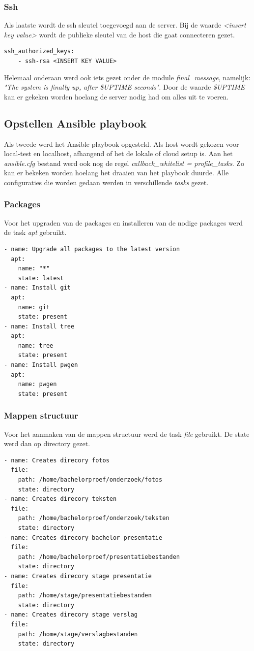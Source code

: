 \subsubsection{Ssh}
Als laatste wordt de ssh sleutel toegevoegd aan de server. Bij de waarde \textit{<insert key value>} wordt de publieke sleutel van de host die gaat connecteren gezet.
\begin{lstlisting}
ssh_authorized_keys:
	- ssh-rsa <INSERT KEY VALUE>
\end{lstlisting}

Helemaal onderaan werd ook iets gezet onder de module \textit{final\_message}, namelijk: \textit{"The system is finally up, after \$UPTIME seconds"}. Door de waarde \textit{\$UPTIME} kan er gekeken worden hoelang de server nodig had om alles uit te voeren.

\subsection{Opstellen Ansible playbook}
Als tweede werd het Ansible playbook opgesteld. Als host wordt gekozen voor local-test en localhost, afhangend of het de lokale of cloud setup is. Aan het \textit{ansible.cfg} bestand werd ook nog de regel \textit{callback\_whitelist = profile\_tasks}. Zo kan er bekeken worden hoelang het draaien van het playbook duurde. Alle configuraties die worden gedaan werden in verschillende \textit{tasks} gezet. 

\subsubsection{Packages}
Voor het upgraden van de packages en installeren van de nodige packages werd de task \textit{apt} gebruikt.
\begin{lstlisting}
- name: Upgrade all packages to the latest version
  apt:
    name: "*"
    state: latest
- name: Install git
  apt:
    name: git
    state: present
- name: Install tree
  apt:
    name: tree
    state: present
- name: Install pwgen
  apt:
    name: pwgen
    state: present
\end{lstlisting}
\subsubsection{Mappen structuur}
Voor het aanmaken van de mappen structuur werd de task \textit{file} gebruikt. De state werd dan op directory gezet.
\begin{lstlisting}
- name: Creates direcory fotos
  file:
    path: /home/bachelorproef/onderzoek/fotos
    state: directory
- name: Creates direcory teksten
  file:
    path: /home/bachelorproef/onderzoek/teksten
    state: directory
- name: Creates direcory bachelor presentatie
  file:
    path: /home/bachelorproef/presentatiebestanden
    state: directory
- name: Creates direcory stage presentatie
  file:
    path: /home/stage/presentatiebestanden
    state: directory
- name: Creates direcory stage verslag
  file:
    path: /home/stage/verslagbestanden
    state: directory
\end{lstlisting}
